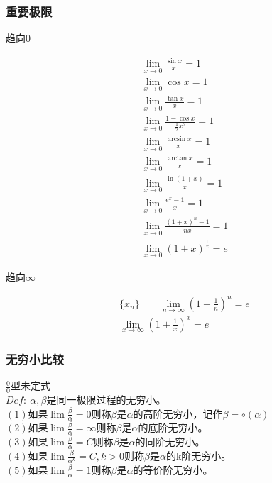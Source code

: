 \subsubsection{重要极限}
\begin{center}
    趋向$0$
\end{center}
\begin{align}
    \lim\limits_{x\to 0}\frac{\sin x}{x}=1 \label{limit_1_1}\\
    \lim\limits_{x\to 0}\cos x=1 \label{limit_1_2}\\
    \lim\limits_{x\to 0}\frac{\tan x}{x}=1 \label{limit_1_3}\\
    \lim\limits_{x\to 0}\frac{1-\cos x}{\frac{1}{2}x^2}=1 \label{limit_1_4}\\
    \lim\limits_{x\to 0}\frac{\arcsin x}{x}=1 \label{limit_1_5}\\
    \lim\limits_{x\to 0}\frac{\arctan x}{x}=1 \label{limit_1_6}\\
    \lim\limits_{x\to 0}\frac{\ln \left(1+x\right)}{x}=1 \label{limit_1_7}\\
    \lim\limits_{x\to 0}\frac{e^x-1}{x}=1 \label{limit_1_8}\\ 
    \lim\limits_{x\to 0}\frac{\left(1+x\right)^n-1}{nx}=1 \label{limit_1_9}\\
    \lim\limits_{x\to 0}\left(1+x\right)^\frac{1}{x}=e \label{limit_1_10}
\end{align}
\begin{center}
    \newpage
    趋向$\infty$
\end{center}
\begin{align}
    \{x_n\}\qquad\lim\limits_{n\to \infty}\left(1+\frac{1}{n}\right)^n=e \label{limit_2_1}\\
    \lim\limits_{x\to \infty}\left(1+\frac{1}{x}\right)^x=e \label{limit_2_2}
\end{align}
\subsubsection{无穷小比较}
$\frac{0}{0}$型未定式\\
$Def:\ \alpha,\beta$是同一极限过程的无穷小。\\
$\left(1\right)$如果$\lim\frac{\beta}{\alpha}=0$则称$\beta$是$\alpha$的高阶无穷小，记作$\beta=\circ \left(\alpha\right)$\\
$\left(2\right)$如果$\lim\frac{\beta}{\alpha}=\infty$则称$\beta$是$\alpha$的底阶无穷小。\\
$\left(3\right)$如果$\lim\frac{\beta}{\alpha}=C$则称$\beta$是$\alpha$的同阶无穷小。\\
$\left(4\right)$如果$\lim\frac{\beta}{\alpha^k}=C,k>0$则称$\beta$是$\alpha$的k阶无穷小。\\
$\left(5\right)$如果$\lim\frac{\beta}{\alpha}=1$则称$\beta$是$\alpha$的等价阶无穷小。
